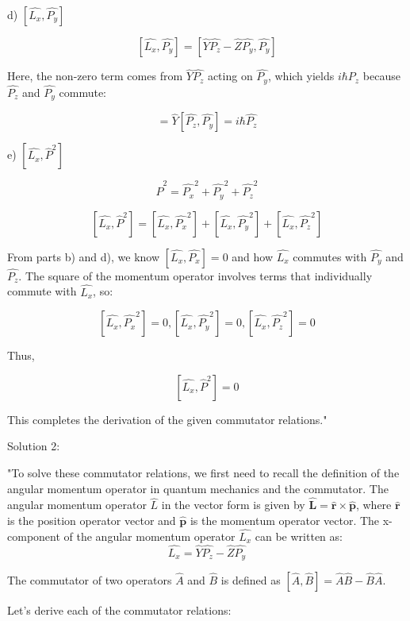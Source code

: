 d) \( \left[ \hat{L_{x}}, \hat{P_{y}} \right] \)

\[ \left[ \hat{L_{x}}, \hat{P_{y}} \right] = \left[ \hat{Y}\hat{P_{z}} - \hat{Z}\hat{P_{y}}, \hat{P_{y}} \right] \]

Here, the non-zero term comes from \( \hat{Y}\hat{P_{z}} \) acting on \( \hat{P_{y}} \), which yields \( i\hbar\hat{P_{z}} \) because \( \hat{P_{z}} \) and \( \hat{P_{y}} \) commute:

\[ = \hat{Y} [ \hat{P_{z}}, \hat{P_{y}} ] = i\hbar \hat{P_{z}} \]

e) \( \left[ \hat{L_{x}}, \hat{P}^{2} \right] \)

\[ \hat{P}^{2} = \hat{P_{x}}^2 + \hat{P_{y}}^2 + \hat{P_{z}}^2 \]

\[ \left[ \hat{L_{x}}, \hat{P}^{2} \right] = \left[ \hat{L_{x}}, \hat{P_{x}}^2 \right] + \left[ \hat{L_{x}}, \hat{P_{y}}^2 \right] + \left[ \hat{L_{x}}, \hat{P_{z}}^2 \right] \]

From parts b) and d), we know \( \left[ \hat{L_{x}}, \hat{P_{x}} \right] = 0 \) and how \( \hat{L_{x}} \) commutes with \( \hat{P_{y}} \) and \( \hat{P_{z}} \). The square of the momentum operator involves terms that individually commute with \( \hat{L_{x}} \), so:

\[ \left[ \hat{L_{x}}, \hat{P_{x}}^2 \right] = 0, \left[ \hat{L_{x}}, \hat{P_{y}}^2 \right] = 0, \left[ \hat{L_{x}}, \hat{P_{z}}^2 \right] = 0 \]

Thus,

\[ \left[ \hat{L_{x}}, \hat{P}^{2} \right] = 0 \]

This completes the derivation of the given commutator relations."

Solution 2: 

"To solve these commutator relations, we first need to recall the definition of the angular momentum operator in quantum mechanics and the commutator. The angular momentum operator \( \hat{L} \) in the vector form is given by \( \hat{\mathbf{L}} = \hat{\mathbf{r}} \times \hat{\mathbf{p}} \), where \( \hat{\mathbf{r}} \) is the position operator vector and \( \hat{\mathbf{p}} \) is the momentum operator vector. The x-component of the angular momentum operator \( \hat{L_{x}} \) can be written as:
\[ \hat{L_{x}} = \hat{Y}\hat{P_{z}} - \hat{Z}\hat{P_{y}} \]

The commutator of two operators \( \hat{A} \) and \( \hat{B} \) is defined as \( [ \hat{A}, \hat{B} ] = \hat{A}\hat{B} - \hat{B}\hat{A} \).

Let's derive each of the commutator relations:

